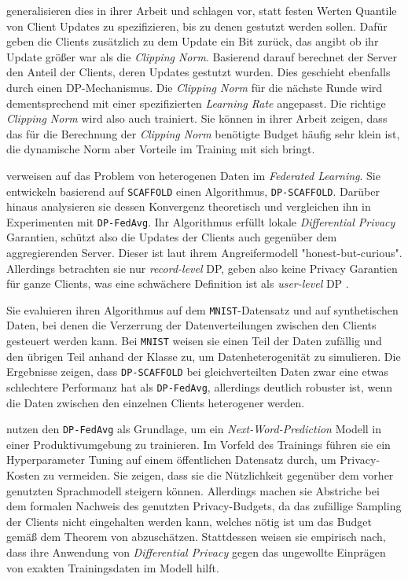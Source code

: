 \textcite{andrew:2021} generalisieren dies in ihrer Arbeit und schlagen vor, statt festen Werten Quantile von Client Updates zu spezifizieren, bis zu denen gestutzt werden sollen. Dafür geben die Clients zusätzlich zu dem Update ein Bit zurück, das angibt ob ihr Update größer war als die \textit{Clipping Norm}. Basierend darauf berechnet der Server den Anteil der Clients, deren Updates gestutzt wurden. Dies geschieht ebenfalls durch einen DP-Mechanismus. Die \textit{Clipping Norm} für die nächste Runde wird dementsprechend mit einer spezifizierten \textit{Learning Rate} angepasst. Die richtige \textit{Clipping Norm} wird also auch trainiert. Sie können in ihrer Arbeit zeigen, dass das für die Berechnung der \textit{Clipping Norm} benötigte Budget häufig sehr klein ist, die dynamische Norm aber Vorteile im Training mit sich bringt.

\textcite{noble:2023} verweisen auf das Problem von heterogenen Daten im \textit{Federated Learning}. Sie entwickeln basierend auf \texttt{SCAFFOLD} einen Algorithmus, \texttt{DP-SCAFFOLD}. Darüber hinaus analysieren sie dessen Konvergenz theoretisch und vergleichen ihn in Experimenten mit \texttt{DP-FedAvg}. Ihr Algorithmus erfüllt lokale \textit{Differential Privacy} Garantien, schützt also die Updates der Clients auch gegenüber dem aggregierenden Server. Dieser ist laut ihrem Angreifermodell "honest-but-curious". Allerdings betrachten sie nur \textit{record-level} DP, geben also keine Privacy Garantien für ganze Clients, was eine schwächere Definition ist als \textit{user-level} DP \cite[p.44]{kairouz:2021}.

Sie evaluieren ihren Algorithmus auf dem \texttt{MNIST}-Datensatz und auf synthetischen Daten, bei denen die Verzerrung der Datenverteilungen zwischen den Clients gesteuert werden kann. Bei \texttt{MNIST} weisen sie einen Teil der Daten zufällig und den übrigen Teil anhand der Klasse zu, um Datenheterogenität zu simulieren. Die Ergebnisse zeigen, dass \texttt{DP-SCAFFOLD} bei gleichverteilten Daten zwar eine etwas schlechtere Performanz hat als \texttt{DP-FedAvg}, allerdings deutlich robuster ist, wenn die Daten zwischen den einzelnen Clients heterogener werden.

\textcite{ramaswamy:2020} nutzen den \texttt{DP-FedAvg} als Grundlage, um ein \textit{Next-Word-Prediction} Modell in einer Produktivumgebung zu trainieren. Im Vorfeld des Trainings führen sie ein Hyperparameter Tuning auf einem öffentlichen Datensatz durch, um Privacy-Kosten zu vermeiden. Sie zeigen, dass sie die Nützlichkeit gegenüber dem vorher genutzten Sprachmodell steigern können. Allerdings machen sie Abstriche bei dem formalen Nachweis des genutzten Privacy-Budgets, da das zufällige Sampling der Clients nicht eingehalten werden kann, welches nötig ist um das Budget gemäß dem Theorem von \textcite{wang:2020} abzuschätzen. Stattdessen weisen sie empirisch nach, dass ihre Anwendung von \textit{Differential Privacy} gegen das ungewollte Einprägen von exakten Trainingsdaten im Modell hilft.

